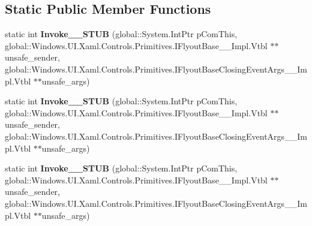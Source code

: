 \subsection*{Static Public Member Functions}
\begin{DoxyCompactItemize}
\item 
\mbox{\label{struct_windows_1_1_foundation_1_1_typed_event_handler___a___windows___u_i___xaml___controls___pr37c6ff56f5f57bf809643c4cf92c5f10_a036733a34e5c5532f59a15dadc6c6440}} 
static int {\bfseries Invoke\+\_\+\+\_\+\+S\+T\+UB} (global\+::\+System.\+Int\+Ptr p\+Com\+This, global\+::\+Windows.\+U\+I.\+Xaml.\+Controls.\+Primitives.\+I\+Flyout\+Base\+\_\+\+\_\+\+Impl.\+Vtbl $\ast$$\ast$unsafe\+\_\+sender, global\+::\+Windows.\+U\+I.\+Xaml.\+Controls.\+Primitives.\+I\+Flyout\+Base\+Closing\+Event\+Args\+\_\+\+\_\+\+Impl.\+Vtbl $\ast$$\ast$unsafe\+\_\+args)
\item 
\mbox{\label{struct_windows_1_1_foundation_1_1_typed_event_handler___a___windows___u_i___xaml___controls___pr37c6ff56f5f57bf809643c4cf92c5f10_a036733a34e5c5532f59a15dadc6c6440}} 
static int {\bfseries Invoke\+\_\+\+\_\+\+S\+T\+UB} (global\+::\+System.\+Int\+Ptr p\+Com\+This, global\+::\+Windows.\+U\+I.\+Xaml.\+Controls.\+Primitives.\+I\+Flyout\+Base\+\_\+\+\_\+\+Impl.\+Vtbl $\ast$$\ast$unsafe\+\_\+sender, global\+::\+Windows.\+U\+I.\+Xaml.\+Controls.\+Primitives.\+I\+Flyout\+Base\+Closing\+Event\+Args\+\_\+\+\_\+\+Impl.\+Vtbl $\ast$$\ast$unsafe\+\_\+args)
\item 
\mbox{\label{struct_windows_1_1_foundation_1_1_typed_event_handler___a___windows___u_i___xaml___controls___pr37c6ff56f5f57bf809643c4cf92c5f10_a036733a34e5c5532f59a15dadc6c6440}} 
static int {\bfseries Invoke\+\_\+\+\_\+\+S\+T\+UB} (global\+::\+System.\+Int\+Ptr p\+Com\+This, global\+::\+Windows.\+U\+I.\+Xaml.\+Controls.\+Primitives.\+I\+Flyout\+Base\+\_\+\+\_\+\+Impl.\+Vtbl $\ast$$\ast$unsafe\+\_\+sender, global\+::\+Windows.\+U\+I.\+Xaml.\+Controls.\+Primitives.\+I\+Flyout\+Base\+Closing\+Event\+Args\+\_\+\+\_\+\+Impl.\+Vtbl $\ast$$\ast$unsafe\+\_\+args)

\end{DoxyCompactItemize}
